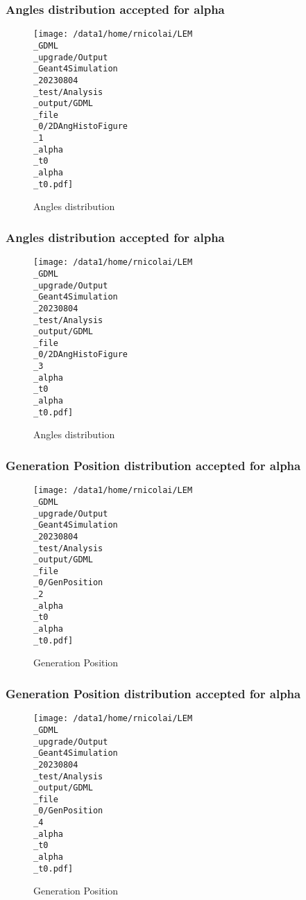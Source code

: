 \documentclass[8pt]{beamer}
\begin{document}
            \begin{frame}
                \frametitle{Angles distribution accepted for alpha}
            
        \begin{figure}[h]
            \centering
            \texttt{[image: /data1/home/rnicolai/LEM\\\_GDML\\\_upgrade/Output\\\_Geant4Simulation\\\_20230804\\\_test/Analysis\\\_output/GDML\\\_file\\\_0/2DAngHistoFigure\\\_1\\\_alpha\\\_t0\\\_alpha\\\_t0.pdf]}
            \caption{Angles distribution}
        \end{figure}
        
            \end{frame}
            
            \begin{frame}
                \frametitle{Angles distribution accepted for alpha}
            
        \begin{figure}[h]
            \centering
            \texttt{[image: /data1/home/rnicolai/LEM\\\_GDML\\\_upgrade/Output\\\_Geant4Simulation\\\_20230804\\\_test/Analysis\\\_output/GDML\\\_file\\\_0/2DAngHistoFigure\\\_3\\\_alpha\\\_t0\\\_alpha\\\_t0.pdf]}
            \caption{Angles distribution}
        \end{figure}
        
            \end{frame}
            
            \begin{frame}
                \frametitle{Generation Position distribution accepted for alpha}
            
        \begin{figure}[h]
            \centering
            \texttt{[image: /data1/home/rnicolai/LEM\\\_GDML\\\_upgrade/Output\\\_Geant4Simulation\\\_20230804\\\_test/Analysis\\\_output/GDML\\\_file\\\_0/GenPosition\\\_2\\\_alpha\\\_t0\\\_alpha\\\_t0.pdf]}
            \caption{Generation Position}
        \end{figure}
        
            \end{frame}
            
            \begin{frame}
                \frametitle{Generation Position distribution accepted for alpha}
            
        \begin{figure}[h]
            \centering
            \texttt{[image: /data1/home/rnicolai/LEM\\\_GDML\\\_upgrade/Output\\\_Geant4Simulation\\\_20230804\\\_test/Analysis\\\_output/GDML\\\_file\\\_0/GenPosition\\\_4\\\_alpha\\\_t0\\\_alpha\\\_t0.pdf]}
            \caption{Generation Position}
        \end{figure}
        
            \end{frame}
            
\end{document}
